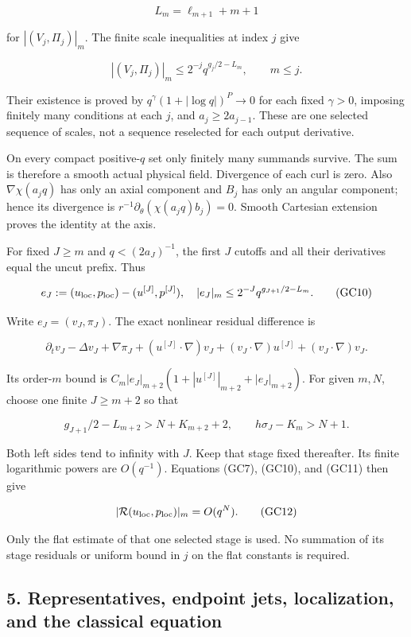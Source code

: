 \documentclass[10pt,a4paper]{article}
\begin{document}
\[
L_m=\ell_{m+1}+m+1
\]

for \(|(V_j,\Pi_j)|_m\). The finite scale inequalities at index \(j\) give

\[
|(V_j,\Pi_j)|_m\le2^{-j}q^{g_j/2-L_m},\qquad m\le j.
\tag{GC9}
\]

Their existence is proved by \(q^\gamma(1+|\log q|)^P\to0\) for each fixed \(\gamma>0\), imposing finitely many conditions at each \(j\), and \(a_j\ge2a_{j-1}\). These are one selected sequence of scales, not a sequence reselected for each output derivative.

On every compact positive-\(q\) set only finitely many summands survive. The sum is therefore a smooth actual physical field. Divergence of each curl is zero. Also \(\nabla\chi(a_jq)\) has only an axial component and \(B_j\) has only an angular component; hence its divergence is \(r^{-1}\partial_\theta(\chi(a_jq)b_j)=0\). Smooth Cartesian extension proves the identity at the axis.

For fixed \(J\ge m\) and \(q<(2a_J)^{-1}\), the first \(J\) cutoffs and all their derivatives equal the uncut prefix. Thus

\[
e_J:=(u_{\rm loc},p_{\rm loc})-(u^{[J]},p^{[J]}),
\quad |e_J|_m\le2^{-J}q^{g_{J+1}/2-L_m}.
\tag{GC10}
\]

Write \(e_J=(v_J,\pi_J)\). The exact nonlinear residual difference is

\[
\partial_tv_J-\Delta v_J+\nabla\pi_J
+(u^{[J]}\cdot\nabla)v_J+(v_J\cdot\nabla)u^{[J]}
+(v_J\cdot\nabla)v_J.
\tag{GC11}
\]

Its order-\(m\) bound is \(C_m|e_J|_{m+2}(1+|u^{[J]}|_{m+2}+|e_J|_{m+2})\). For given \(m,N\), choose one finite \(J\ge m+2\) so that

\[
g_{J+1}/2-L_{m+2}>N+K_{m+2}+2,\qquad
h\sigma_J-K_m>N+1.
\]

Both left sides tend to infinity with \(J\). Keep that stage fixed thereafter. Its finite logarithmic powers are \(O(q^{-1})\). Equations (GC7), (GC10), and (GC11) then give

\[
|\mathcal R(u_{\rm loc},p_{\rm loc})|_m=O(q^N).
\tag{GC12}
\]

Only the flat estimate of that one selected stage is used. No summation of its stage residuals or uniform bound in \(j\) on the flat constants is required.

\subsection{5. Representatives, endpoint jets, localization, and the classical equation}\label{gclosure:representatives-endpoint-jets-localization-and-the-classical-equation}
\end{document}
